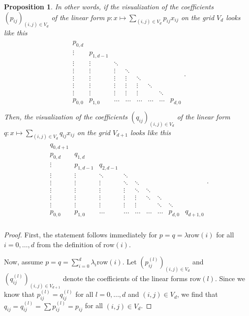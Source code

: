 \documentclass[11pt]{article}
\newtheorem{proposition}[theorem]{Proposition}
\begin{document}
\begin{proposition}
  In other words, if the visualization of the coefficients \( (p_{ij})_{(i,j) \in V_d} \) of the linear form \( p: x \mapsto \sum_{(i,j) \in V_d} p_{ij}x_{ij} \) on the grid \( V_d \) looks like this
  \begin{align*}
    \begin{matrix}
      p_{0,d} & & & \\
      \vdots & p_{1,d-1} & & &    \\
      \vdots & \vdots & \ddots & &    \\
      \vdots & \vdots & \vdots & \ddots &    \\
      \vdots & \vdots & \vdots & \vdots & \ddots &  &\\
      \vdots & \vdots & \vdots & \vdots &  \vdots  & \ddots  \\
      \vdots & \vdots & \vdots & \vdots &  \vdots  & & \ddots\\
      p_{0,0} & p_{1,0} & \hdots & \hdots &  \hdots  & \hdots & \hdots & p_{d,0} \\
    \end{matrix}.
  \end{align*}
  Then, the visualization of the coefficients \( (q_{ij})_{(i,j) \in V_d} \) of the linear form \( q: x \mapsto \sum_{(i,j) \in V_d} q_{ij}x_{ij} \) on the grid \( V_{d+1} \) looks like this
  \begin{align*}
    \begin{matrix}
      q_{0,{d+1}} & & & \\
      p_{0,d} & q_{1, d} & & \\
      \vdots & p_{1,d-1} & q_{2, d-1} & &    \\
      \vdots & \vdots & \ddots & \ddots &    \\
      \vdots & \vdots & \vdots & \ddots & \ddots    \\
      \vdots & \vdots & \vdots & \vdots & \ddots & \ddots &\\
      \vdots & \vdots & \vdots & \vdots &  \vdots  & \ddots & \ddots  \\
      \vdots & \vdots & \vdots & \vdots &  \vdots  & & \ddots & \ddots \\
      p_{0,0} & p_{1,0} & \hdots & \hdots &  \hdots  & \hdots & \hdots & p_{d,0} & q_{d+1, 0} \\
    \end{matrix}.
  \end{align*}
\end{proposition}

\begin{proof}
  First, the statement follows immediately for \( p=q= \lambda \mathrm{row}(i) \) for all \( i = 0, \dots, d \) from the definition of \( \mathrm{row}(i) \). 
  
  Now, assume \(  p = q = \sum_{i=0}^{d}  \lambda_{i} \mathrm{row}(i)  \). Let \( (p^{(l)}_{ij})_{(i,j) \in V_d} \) and \( (q^{(l)}_{ij})_{(i,j) \in V_{d+1}} \) denote the coefficients of the linear forms \( \mathrm{row}(l) \). Since we know that \( p^{(l)}_{ij} = q^{(l)}_{ij} \) for all \( l = 0, \dots, d \) and \( (i,j) \in V_d \), we find that \( q_{ij} = q^{(l)}_{ij} = \sum p^{(l)}_{ij} = p_{ij} \) for all \( (i,j) \in V_d \).
\end{proof}
\end{document}
